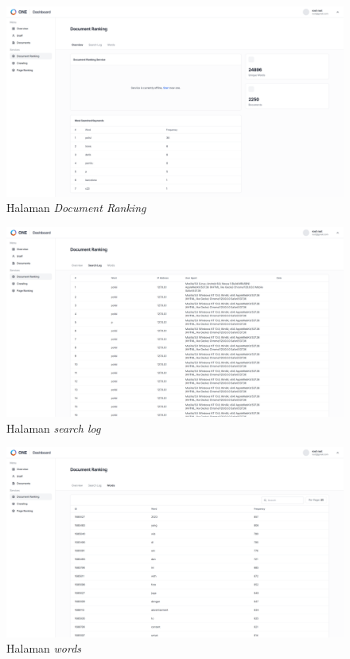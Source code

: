 \documentclass[
	a4paper, %
	10pt, %
	unnumberedsections, %
	twoside, %
]{LTJournalArticle}
\begin{document}
\begin{figure}[H]
	\includegraphics[width=\linewidth]{view_document_ranking_overview.png}
	\caption{Halaman \textit{Document Ranking}}
	\label{gambar:halaman_document_ranking_overview}
\end{figure}
\begin{figure}[H]
	\includegraphics[width=\linewidth]{view_document_ranking_search_logs.png}
	\caption{Halaman \textit{search log}}
	\label{gambar:halaman_search_log}
\end{figure}
\begin{figure}[H]
	\includegraphics[width=\linewidth]{view_document_ranking_words.png}
	\caption{Halaman \textit{words}}
	\label{gambar:halaman_words}
\end{figure}
\end{document}
